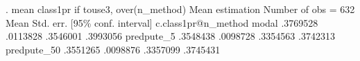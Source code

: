 . mean class1pr if touse3, over(n_method)
{\smallskip}
Mean estimation                                   Number of obs = 632
{\smallskip}
                    {\VBAR}       Mean   Std. err.     [95\% conf. interval]
c.class1pr@n_method {\VBAR}
             modal  {\VBAR}   .3769528   .0113828      .3546001    .3993056
        predpute_5  {\VBAR}   .3548438   .0098728      .3354563    .3742313
       predpute_50  {\VBAR}   .3551265   .0098876      .3357099    .3745431
